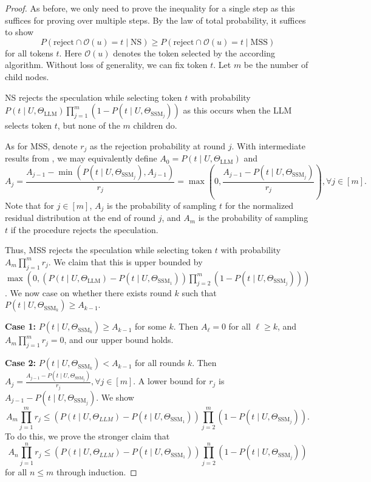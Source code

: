 \begin{proof}
As before, we only need to prove the inequality for a single step as this suffices for proving over multiple steps. By the law of total probability, it suffices to show
$$P(\textrm{reject} \cap \mathcal{O}(u)=t \mid \textrm{NS}) \geq P(\textrm{reject} \cap \mathcal{O}(u)=t \mid \textrm{MSS})$$
for all tokens $t$. Here $\mathcal{O}(u)$ denotes the token selected by the according algorithm. Without loss of generality, we can fix token $t$. Let $m$ be the number of child nodes.

NS rejects the speculation while selecting token $t$ with probability $P(t \mid U, \Theta_{\textrm{LLM}})\prod_{j=1}^m (1-P(t \mid U, \Theta_{\textrm{SSM}_j}))$ as this occurs when the LLM selects token $t$, but none of the $m$ children do.

As for MSS, denote $r_j$ as the rejection probability at round $j$. With intermediate results from , we may equivalently define $A_0 = P(t \mid U, \Theta_{\textrm{LLM}})$ and
$$A_{j} = \frac{A_{j-1} - \min(P(t \mid U, \Theta_{\textrm{SSM}_j}),A_{j-1})}{r_j} = \max\left(0, \frac{A_{j-1}-P(t \mid U, \Theta_{\textrm{SSM}_j})}{r_j}\right), \forall j \in [m].$$
Note that for $j \in [m]$, $A_j$ is the probability of sampling $t$ for the normalized residual distribution at the end of round $j$, and $A_{m}$ is the probability of sampling $t$ if the procedure rejects the speculation.

Thus, MSS rejects the speculation while selecting token $t$ with probability $A_{m}\prod_{j=1}^m r_j$. We claim that this is upper bounded by $\max(0, (P(t \mid U, \Theta_{\textrm{LLM}})-P(t \mid U, \Theta_{\textrm{SSM}_1}))\prod_{j=2}^m (1-P(t \mid U, \Theta_{\textrm{SSM}_j})))$.
We now case on whether there exists round $k$ such that $P(t \mid U, \Theta_{\textrm{SSM}_k}) \geq A_{k-1}$.

\textbf{Case 1:} $P(t \mid U, \Theta_{\textrm{SSM}_k}) \geq A_{k-1}$ for some $k$. Then $A_{\ell} = 0$ for all $\ell \geq k$, and $A_{m}\prod_{j=1}^m r_j = 0$, and our upper bound holds.

\textbf{Case 2:} $P(t \mid U, \Theta_{\textrm{SSM}_k}) < A_{k-1}$ for all rounds $k$. Then $A_{j} = \frac{A_{j-1}-P(t \mid U, \Theta_{\textrm{SSM}_j})}{r_j}, \forall j \in [m]$. A lower bound for $r_j$ is $A_{j-1} - P(t \mid U, \Theta_{\textrm{SSM}_j})$. We show
$$
A_{m}\prod_{j=1}^m r_j \leq (P(t \mid U, \Theta_{LLM}) -P(t \mid U, \Theta_{\textrm{SSM}_1}))\prod_{j=2}^m (1-P(t \mid U, \Theta_{\textrm{SSM}_j})).
$$
To do this, we prove the stronger claim that
$$
 A_{n} \prod_{j=1}^n r_j \leq (P(t \mid U, \Theta_{LLM}) -P(t \mid U, \Theta_{\textrm{SSM}_1}))\prod_{j=2}^n (1-P(t \mid U, \Theta_{\textrm{SSM}_j}))
$$
for all $n \leq m$ through induction.


\end{proof}
